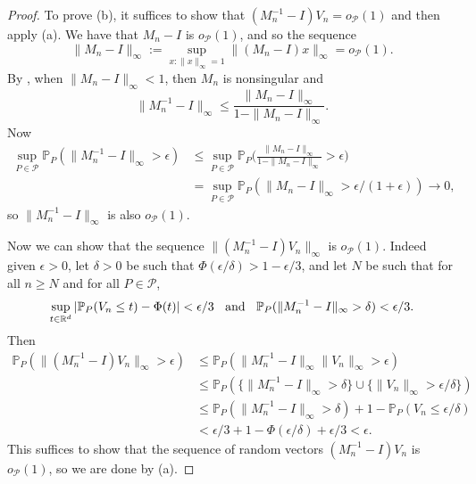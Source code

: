 \documentclass[aos]{imsart}
\renewcommand{\Pr}{\mathbb{P}}
\newcommand{\R}{\mathbb{R}}
\begin{document}
\begin{proof}
		To prove (b), it suffices to show that $(M_n^{-1}-I)V_n = o_\mathcal{P}(1)$ and then apply (a). We have that $M_n-I$ is $o_\mathcal{P}(1)$, and so the sequence
		\begin{equation*}
			\|M_n-I\|_\infty := \sup_{x:\|x\|_\infty=1} \|(M_n-I)x\|_\infty = o_\mathcal{P}(1).
		\end{equation*}
		By \citet[Thm.~2.3.4]{GolubMatrix}, when $\|M_n-I\|_\infty <1$, then $M_n$ is nonsingular and \begin{equation*}
			\|M_n^{-1}-I\|_\infty \leq \frac{\|M_n-I\|_\infty}{1-\|M_n-I\|_\infty}.
		\end{equation*}
		Now \begin{align*}
			\sup_{P\in\mathcal{P}} \Pr_P(\|M_n^{-1}-I\|_\infty>\epsilon) & \leq \sup_{P\in\mathcal{P}} \Pr_P\bigg(\frac{\|M_n-I\|_\infty}{1-\|M_n-I\|_\infty}>\epsilon\bigg)\\
			&= \sup_{P\in\mathcal{P}}\Pr_P(\|M_n-I\|_\infty>\epsilon/(1+\epsilon)) \to 0,
		\end{align*}
		so $\|M_n^{-1}-I\|_\infty$ is also $o_\mathcal{P}(1)$. 
		
		Now we can show that the sequence $\|(M_n^{-1}-I)V_n\|_\infty$ is $o_\mathcal{P}(1)$. Indeed given $\epsilon>0$, let $\delta>0$ be such that $\Phi(\epsilon/\delta)>1-\epsilon/3$, and let $N$ be such that for all $n\geq N$ and for all $P\in\mathcal{P}$,
		\begin{equation*}
			\sup_{t\in\R^d} |\Pr_P(V_n\leq t)-\Phi(t)|<\epsilon/3 \text{\;\; and \;\;} \Pr_P(\|M_n^{-1}-I\|_\infty>\delta) < \epsilon/3.
		\end{equation*}
		Then 
		\begin{align*}     
			\Pr_P(\|(M_n^{-1}-I)V_n\|_\infty>\epsilon)&\leq \Pr_P(\|M_n^{-1}-I\|_\infty\|V_n\|_\infty>\epsilon)\\
			&\leq \Pr_P(\{\|M_n^{-1}-I\|_\infty>\delta\}\cup \{\|V_n\|_\infty>\epsilon/\delta\})\\
			&\leq \Pr_P(\|M_n^{-1}-I\|_\infty>\delta) +  1-\Pr_P(V_n\leq\epsilon/\delta)\\
			&< \epsilon/3 + 1-\Phi(\epsilon/\delta) + \epsilon/3 < \epsilon.
		\end{align*}
		This suffices to show that the sequence of random vectors $(M_n^{-1}-I)V_n$ is $o_\mathcal{P}(1)$, so we are done by (a).
	\end{proof}
	
\end{document}
